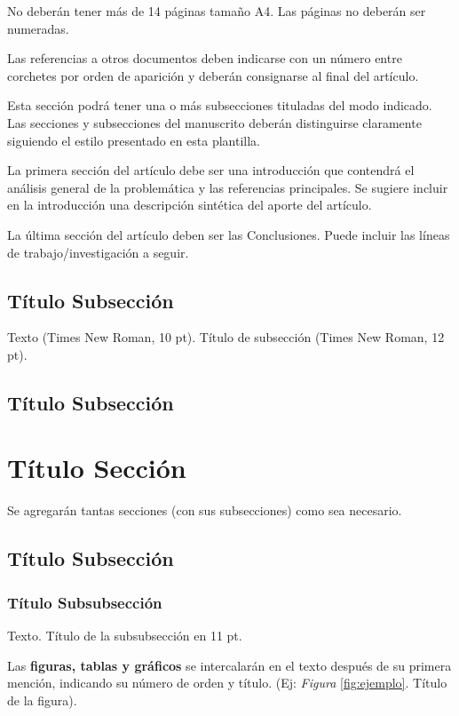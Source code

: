 \documentclass[a4paper,10pt]{article}
\begin{document}
No deberán tener más de 14 páginas tamaño A4. Las páginas no deberán ser numeradas.

Las referencias a otros documentos deben indicarse con un número entre corchetes por orden de aparición y deberán consignarse al final del artículo. 

Esta sección podrá tener una o más subsecciones tituladas del modo indicado. Las secciones y subsecciones del manuscrito deberán distinguirse claramente siguiendo el estilo presentado en esta plantilla. 

La primera sección del artículo debe ser una introducción que contendrá el análisis general de la problemática y las referencias principales. Se sugiere incluir en la introducción una descripción sintética del aporte del artículo.

La última sección del artículo deben ser las Conclusiones. Puede incluir las líneas de trabajo/investigación a seguir.

\subsection{Título Subsección}
Texto (Times New Roman, 10 pt). Título de subsección (Times New Roman, 12 pt). 

\lipsum[1]

\subsection{Título Subsección}
\lipsum[2]

\section{Título Sección}
Se agregarán tantas secciones (con sus subsecciones) como sea necesario.

\lipsum[3]

\subsection{Título Subsección}
\lipsum[4]

\subsubsection{Título Subsubsección}

Texto. Título de la subsubsección en 11 pt.

Las \textbf{figuras, tablas y gráficos} se intercalarán en el texto después de su primera mención, indicando su número de orden y título. (Ej: \emph{Figura} \ref{fig:ejemplo}. Título de la figura). 
\end{document}
